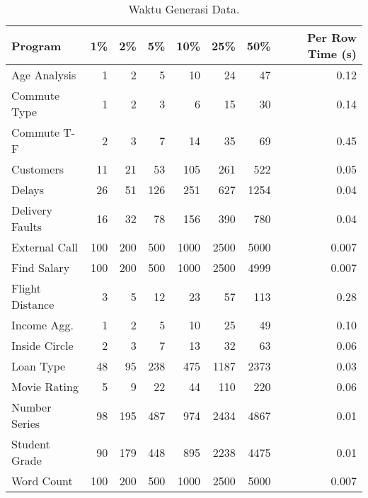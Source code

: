 \begin{longtable}{|l|r|r|r|r|r|r|r|}
      \caption{Waktu Generasi Data.}
      \label{tb:HasilPengujianGenTime} \\
      \hline
      \rowcolor[HTML]{C0C0C0}
      \textbf{Program} & \textbf{1\%} & \textbf{2\%} & \textbf{5\%} & \textbf{10\%} & \textbf{25\%} & \textbf{50\%} & \textbf{Per Row Time (s)} \\
      \hline
      Age Analysis & 1 & 2 & 5 & 10 & 24 & 47 & 0.12 \\
      \hline
      Commute Type & 1 & 2 & 3 & 6 & 15 & 30 & 0.14 \\
      \hline
      Commute T-F & 2 & 3 & 7 & 14 & 35 & 69 & 0.45 \\
      \hline
      Customers & 11 & 21 & 53 & 105 & 261 & 522 & 0.05 \\
      \hline
      Delays & 26 & 51 & 126 & 251 & 627 & 1254 & 0.04 \\
      \hline
      Delivery Faults & 16 & 32 & 78 & 156 & 390 & 780 & 0.04 \\
      \hline
      External Call & 100 & 200 & 500 & 1000 & 2500 & 5000 & 0.007 \\
      \hline
      Find Salary & 100 & 200 & 500 & 1000 & 2500 & 4999 & 0.007 \\
      \hline
      Flight Distance & 3 & 5 & 12 & 23 & 57 & 113 & 0.28 \\
      \hline
      Income Agg. & 1 & 2 & 5 & 10 & 25 & 49 & 0.10 \\
      \hline
      Inside Circle & 2 & 3 & 7 & 13 & 32 & 63 & 0.06 \\
      \hline
      Loan Type & 48 & 95 & 238 & 475 & 1187 & 2373 & 0.03 \\
      \hline
      Movie Rating & 5 & 9 & 22 & 44 & 110 & 220 & 0.06 \\
      \hline
      Number Series & 98 & 195 & 487 & 974 & 2434 & 4867 & 0.01 \\
      \hline
      Student Grade & 90 & 179 & 448 & 895 & 2238 & 4475 & 0.01 \\
      \hline
      Word Count & 100 & 200 & 500 & 1000 & 2500 & 5000 & 0.007 \\
      \hline
\end{longtable}
